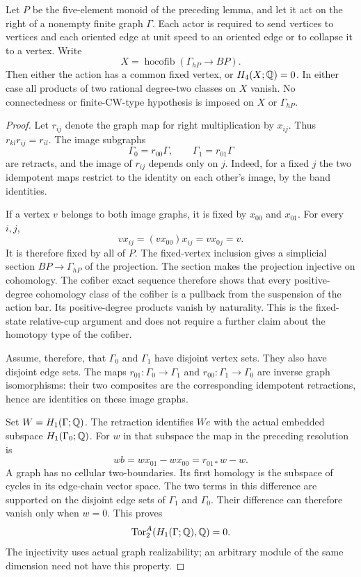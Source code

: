 \begin{theorem}
\label{C:P5-graph-cofiber-cups}
Let $P$ be the five-element monoid of the preceding lemma, and let
it act on the right of a nonempty finite graph $\Gamma$.
Each actor is required to send vertices to vertices and each
oriented edge at unit speed to an oriented edge or to collapse
it to a vertex.  Write
\[
 X=\operatorname{hocofib}(\Gamma_{hP}\longrightarrow BP).
\]
Then either the action has a common fixed vertex, or
$H_4(X;\mathbb Q)=0$.  In either case all products of two rational
degree-two classes on $X$ vanish.  No connectedness or
finite-CW-type hypothesis is imposed on $X$ or $\Gamma_{hP}$.
\end{theorem}
\begin{proof}
Let $r_{ij}$ denote the graph map for right multiplication by
$x_{ij}$.  Thus $r_{kl}r_{ij}=r_{il}$.  The image subgraphs
\[
 \Gamma_0=r_{00}\Gamma,\qquad \Gamma_1=r_{01}\Gamma
\]
are retracts, and the image of $r_{ij}$ depends only on $j$.
Indeed, for a fixed $j$ the two idempotent maps restrict to
the identity on each other's image, by the band identities.

If a vertex $v$ belongs to both image graphs, it is fixed by
$x_{00}$ and $x_{01}$.  For every $i,j$,
\[
 v x_{ij}=(v x_{00})x_{ij}=v x_{0j}=v.
\]
It is therefore fixed by all of $P$.  The fixed-vertex inclusion
gives a simplicial section $BP\to\Gamma_{hP}$ of the projection.
The section makes the projection injective on cohomology.
The cofiber exact sequence therefore shows that every
positive-degree cohomology class of the cofiber is a pullback
from the suspension of the action bar.  Its positive-degree
products vanish by naturality.  This is the fixed-state
relative-cup argument and does not require a further claim
about the homotopy type of the cofiber.

Assume, therefore, that $\Gamma_0$ and $\Gamma_1$ have disjoint
vertex sets.  They also have disjoint edge sets.  The maps
$r_{01}:\Gamma_0\to\Gamma_1$ and
$r_{00}:\Gamma_1\to\Gamma_0$ are inverse graph isomorphisms:
their two composites are the corresponding idempotent
retractions, hence are identities on these image graphs.

Set $W=H_1(\Gamma;\mathbb Q)$.  The retraction identifies
$We$ with the actual embedded subspace $H_1(\Gamma_0;\mathbb Q)$.
For $w$ in that subspace the map in the preceding resolution is
\[
 wb=w x_{01}-w x_{00}=r_{01*}w-w.
\]
A graph has no cellular two-boundaries.  Its first homology is
the subspace of cycles in its edge-chain vector space.
The two terms in this difference are supported on the disjoint
edge sets of $\Gamma_1$ and $\Gamma_0$.  Their difference can
therefore vanish only when $w=0$.  This proves
\[
 \operatorname{Tor}_2^A(H_1(\Gamma;\mathbb Q),\mathbb Q)=0.
\]
The injectivity uses actual graph realizability; an arbitrary
module of the same dimension need not have this property.


\end{proof}
